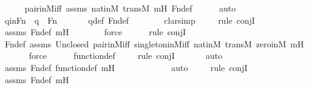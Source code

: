 \begin{isabellebody}
\ \ \ \ \isamarkupfalse%
\ pair{\isacharunderscore}{\kern0pt}in{\isacharunderscore}{\kern0pt}M{\isacharunderscore}{\kern0pt}iff\ assms\ nat{\isacharunderscore}{\kern0pt}in{\isacharunderscore}{\kern0pt}M\ transM\ mH\ Fn{\isacharunderscore}{\kern0pt}def\isanewline
\ \ \ \ \isamarkupfalse%
\ auto\isanewline
\isanewline
\ \ \isamarkupfalse%
\ qinFn\ {\isacharcolon}{\kern0pt}\ {\isachardoublequoteopen}q\ {\isasymin}\ Fn{\isachardoublequoteclose}\ \isanewline
\ \ \ \ \isamarkupfalse%
\ q{\isacharunderscore}{\kern0pt}def\ Fn{\isacharunderscore}{\kern0pt}def\ \ \isanewline
\ \ \ \ \isamarkupfalse%
\ clarsimp\isanewline
\ \ \ \ \isamarkupfalse%
{\isacharparenleft}{\kern0pt}rule\ conjI{\isacharparenright}{\kern0pt}\isanewline
\ \ \ \ \isamarkupfalse%
\ assms\ Fn{\isacharunderscore}{\kern0pt}def\ mH\ \isanewline
\ \ \ \ \ \isamarkupfalse%
\ force\ \isanewline
\ \ \ \ \isamarkupfalse%
{\isacharparenleft}{\kern0pt}rule\ conjI{\isacharparenright}{\kern0pt}\isanewline
\ \ \ \ \isamarkupfalse%
\ Fn{\isacharunderscore}{\kern0pt}def\ assms\ Un{\isacharunderscore}{\kern0pt}closed\ pair{\isacharunderscore}{\kern0pt}in{\isacharunderscore}{\kern0pt}M{\isacharunderscore}{\kern0pt}iff\ singleton{\isacharunderscore}{\kern0pt}in{\isacharunderscore}{\kern0pt}M{\isacharunderscore}{\kern0pt}iff\ nat{\isacharunderscore}{\kern0pt}in{\isacharunderscore}{\kern0pt}M\ transM\ zero{\isacharunderscore}{\kern0pt}in{\isacharunderscore}{\kern0pt}M\ mH\isanewline
\ \ \ \ \ \isamarkupfalse%
\ force\isanewline
\ \ \ \ \isamarkupfalse%
\ function{\isacharunderscore}{\kern0pt}def\isanewline
\ \ \ \ \isamarkupfalse%
{\isacharparenleft}{\kern0pt}rule\ conjI{\isacharparenright}{\kern0pt}\isanewline
\ \ \ \ \ \isamarkupfalse%
\ auto{\isacharbrackleft}{\kern0pt}{}{\isacharbrackright}{\kern0pt}\isanewline
\ \ \ \ \isamarkupfalse%
\ assms\ Fn{\isacharunderscore}{\kern0pt}def\ function{\isacharunderscore}{\kern0pt}def\ mH\isanewline
\ \ \ \ \ \ \ \ \ \ \ \isamarkupfalse%
\ auto{\isacharbrackleft}{\kern0pt}{}{\isacharbrackright}{\kern0pt}\isanewline
\ \ \ \ \isamarkupfalse%
{\isacharparenleft}{\kern0pt}rule\ conjI{\isacharparenright}{\kern0pt}\isanewline
\ \ \ \ \isamarkupfalse%
\ assms\ Fn{\isacharunderscore}{\kern0pt}def\ mH\isanewline
\ \ \ \ \ \isamarkupfalse%

\end{isabellebody}
